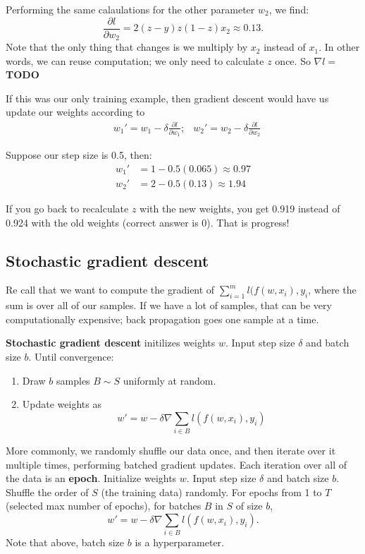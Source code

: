 \documentclass[titlepage, 12pt, leqno]{article}
\begin{document}
Performing the same calaulations for the other parameter $w_{2}$, we find:
\[
    \frac{\partial l}{\partial w_{2}} = 2(z-y)z(1-z)x_{2 }\approx0.13.
\]
Note that the only thing that changes is we multiply by $x_{2}$ instead of
$x_{1}$. In other words, we can reuse computation; we only need to calculate
$z$ once. So $\nabla l = $ \textbf{TODO}

If this was our only training example, then gradient descent would have us 
update our weights according to
\begin{align*}
    &w_{1}' = w_{1} - \delta \frac{\partial l}{\partial w_{1}};
    &w_{2}' = w_{2} - \delta \frac{\partial l}{\partial w_{2}}
\end{align*}

Suppose our step size is 0.5, then:
\begin{align*}
    w_{1}' &= 1 - 0.5(0.065) \approx 0.97\\
    w_{2}' &= 2 - 0.5(0.13) \approx 1.94
\end{align*}

If you go back to recalculate $z$ with the new weights, you get 0.919 instead
of 0.924 with the old weights (correct answer is 0). That is progress!

\subsection{Stochastic gradient descent}
Re call that we want to compute the gradient of $\sum_{i=1}^{m}l(f(w,x_{i}),
y_{i}$, where the sum is over all of our samples. If we have a lot of samples,
that can be very computationally expensive; back propagation goes one sample
at a time.
\begin{definition}
    \textbf{Stochastic gradient descent} initilizes weights $w$. Input step
    size $\delta$ and batch size $b$. Until convergence:
    \begin{enumerate}
        \item Draw $b$ samples $B \sim S$ uniformly at random.
        \item Update weights as
            \[
            w' = w - \delta \nabla \sum_{i \in B}l(f(w,x_{i}),y_{i})
            \]
    \end{enumerate}
\end{definition}
More commonly, we randomly shuffle our data once, and then iterate over it
multiple times, performing batched gradient updates. Each iteration over all 
of the data is an \textbf{epoch}. Initialize weights $w$. Input step size
$\delta$ and batch size $b$. Shuffle the order of $S$ (the training data)
randomly. For epochs from 1 to $T$ (selected max number of epochs), for batches 
$B$ in $S$ of size $b$,
\[
    w' = w - \delta \nabla \sum_{i \in B}l(f(w,x_{i}),y_{i}).
\]
Note that above, batch size $b$ is a hyperparameter.
\end{document}
